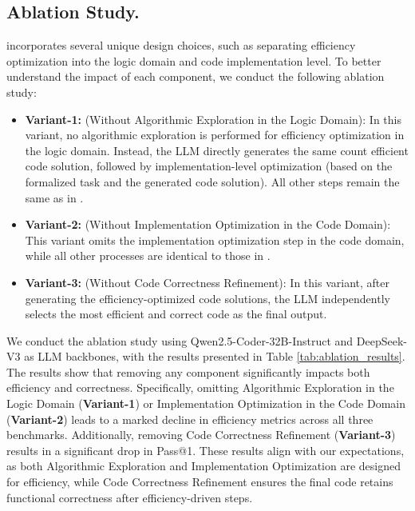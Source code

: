 \subsection{Ablation Study.}
\tool incorporates several unique design choices, such as separating efficiency optimization into the logic domain and code implementation level. To better understand the impact of each component, we conduct the following ablation study:
\begin{itemize}[leftmargin=*,itemsep=2pt,topsep=0pt,parsep=0pt]
    \item \textbf{Variant-1:} (Without Algorithmic Exploration in the Logic Domain): In this variant, no algorithmic exploration is performed for efficiency optimization in the logic domain. Instead, the LLM directly generates the same count efficient code solution, followed by implementation-level optimization (based on the formalized task and the generated code solution). All other steps remain the same as in \tool.
    \item \textbf{Variant-2:} (Without Implementation Optimization in the Code Domain): This variant omits the implementation optimization step in the code domain, while all other processes are identical to those in \tool.
    \item \textbf{Variant-3:} (Without Code Correctness Refinement): In this variant, after generating the efficiency-optimized code solutions, the LLM independently selects the most efficient and correct code as the final output.
\end{itemize}
We conduct the ablation study using Qwen2.5-Coder-32B-Instruct and DeepSeek-V3 as LLM backbones, with the results presented in Table \ref{tab:ablation_results}. The results show that removing any component significantly impacts both efficiency and correctness. Specifically, omitting Algorithmic Exploration in the Logic Domain (\textbf{Variant-1}) or Implementation Optimization in the Code Domain (\textbf{Variant-2}) leads to a marked decline in efficiency metrics across all three benchmarks. Additionally, removing Code Correctness Refinement (\textbf{Variant-3}) results in a significant drop in Pass@1. These results align with our expectations, as both Algorithmic Exploration and Implementation Optimization are designed for efficiency, while Code Correctness Refinement ensures the final code retains functional correctness after efficiency-driven steps.
